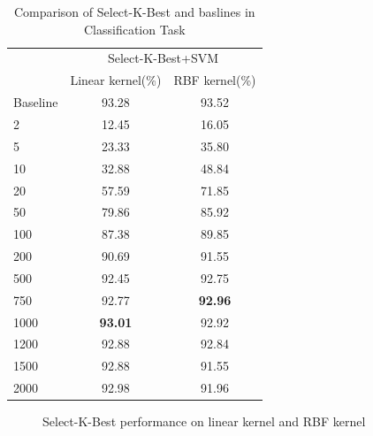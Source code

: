 \documentclass{article}
\begin{document}
\begin{table}[htbp]
	\centering
	\newcommand{\tabincell}[2]{\begin{tabular}{@{}#1@{}}#2\end{tabular}}
	\renewcommand\arraystretch{1.0}
	\caption{Comparison of Select-K-Best and baslines in Classification Task}
	\label{base1}%
	\begin{tabular}{@{}p{2.5cm}<{\centering}|c|c}
		\hline
		\multirow{2}{*}{\diagbox[height=2\line,width=2.7cm,font=\tiny,trim=lr]{$d$}{Acc.}{$\mathit{M}$}} &\multicolumn{2}{c}{Select-K-Best+SVM}\\
		\cline{2-3}
			& {Linear kernel(\%)} & {RBF kernel(\%)}\\
		\cline{2-3}
		\hline
		Baseline & 93.28 & 93.52\\
		\hline
		2   & 12.45 & 16.05\\
		\hline
		5   & 23.33 & 35.80\\
		\hline
		10  & 32.88 & 48.84\\
		\hline
		20  & 57.59 & 71.85\\
		\hline
		50  & 79.86 & 85.92\\
		\hline
		100 & 87.38 & 89.85\\
		\hline
		200 & 90.69 & 91.55\\
		\hline
		500 & 92.45 & 92.75\\
		\hline
		750 & 92.77 & \textbf{92.96}\\
		\hline
		1000 & \textbf{93.01} & 92.92\\
		\hline
		1200 & 92.88 & 92.84\\
		\hline
		1500 & 92.88 & 91.55\\
		\hline
		2000 & 92.98 & 91.96\\
		\hline
\end{tabular}
\end{table}

\begin{figure}[htbp]
	\centering
	\quad
	\caption{Select-K-Best performance on linear kernel and RBF kernel}
	\label{Figure1}
\end{figure}
\end{document}
